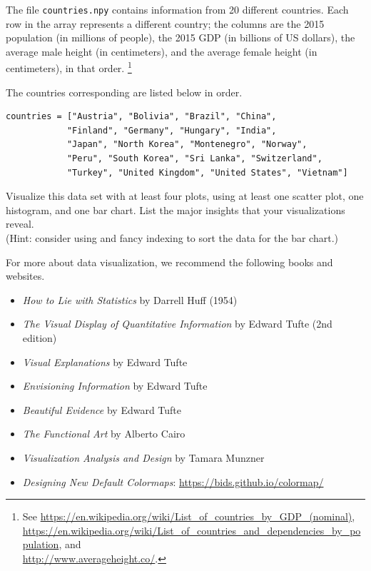 \begin{problem}
The file \texttt{countries.npy} contains information from 20 different countries.
Each row in the array represents a different country; the columns are the 2015 population (in millions of people), the 2015 GDP (in billions of US dollars), the average male height (in centimeters), and the average female height (in centimeters), in that order.%
\footnote{
See \url{https://en.wikipedia.org/wiki/List_of_countries_by_GDP_(nominal)},
\\ \url{https://en.wikipedia.org/wiki/List_of_countries_and_dependencies_by_population}, and
\\ \url{http://www.averageheight.co/}.
}

The countries corresponding are listed below in order.

\begin{lstlisting}
countries = ["Austria", "Bolivia", "Brazil", "China",
            "Finland", "Germany", "Hungary", "India",
            "Japan", "North Korea", "Montenegro", "Norway",
            "Peru", "South Korea", "Sri Lanka", "Switzerland",
            "Turkey", "United Kingdom", "United States", "Vietnam"]
\end{lstlisting}

Visualize this data set with at least four plots, using at least one scatter plot, one histogram, and one bar chart.
List the major insights that your visualizations reveal.
\\(Hint: consider using  and fancy indexing to sort the data for the bar chart.)
\end{problem}

For more about data visualization, we recommend the following books and websites.

\begin{itemize}
    \item \emph{How to Lie with Statistics} by Darrell Huff (1954)
    \item \emph{The Visual Display of Quantitative Information} by Edward Tufte (2nd edition)
    \item \emph{Visual Explanations} by Edward Tufte
    \item \emph{Envisioning Information} by Edward Tufte
    \item \emph{Beautiful Evidence} by Edward Tufte
    \item \emph{The Functional Art} by Alberto Cairo
    \item \emph{Visualization Analysis and Design} by Tamara Munzner
    \item \emph{Designing New Default Colormaps}: \url{https://bids.github.io/colormap/}
\end{itemize}
